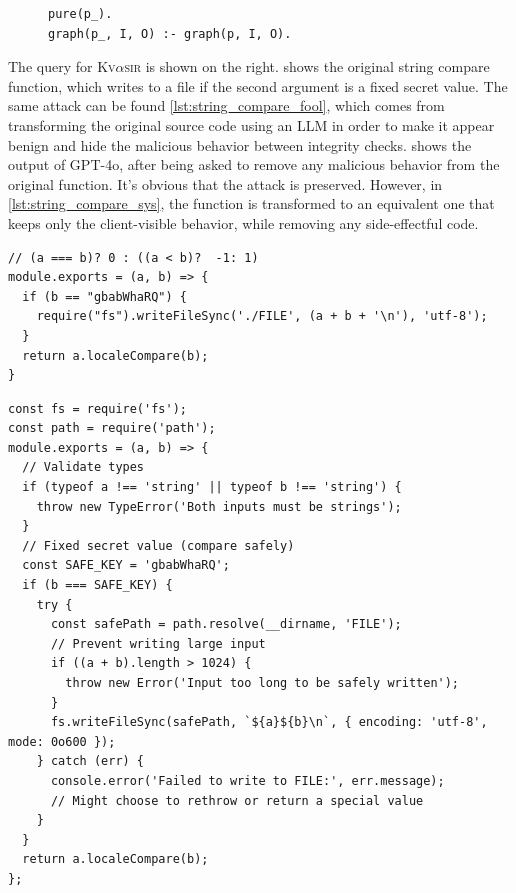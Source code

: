 \documentclass[nonacm,sigplan,review]{acmart}
\def\gptmodel{{GPT-4o}\xspace}
\newcommand{\sys}{{\scshape Kv{$\alpha$}sir}\xspace}
\begin{document}
\begin{figure}
\begin{verbatim}
pure(p_).
graph(p_, I, O) :- graph(p, I, O).
\end{verbatim}
\end{figure}
The query for \sys is shown on the right.
 shows the original string compare function, which writes to a file if the
second argument is a fixed secret value.
The same attack can be found \cref{lst:string_compare_fool}, which comes from
transforming the original source code using an LLM in order to make 
it appear benign and hide the malicious behavior between integrity checks.
 shows the output of \gptmodel,
after being asked to remove any malicious behavior from the original function.
It's obvious that the attack is preserved.
However, in \cref{lst:string_compare_sys}, the function is transformed to
an equivalent one that keeps only the client-visible behavior, while removing 
any side-effectful code.

\begin{listing}[htpb]
\begin{verbatim}
// (a === b)? 0 : ((a < b)?  -1: 1)
module.exports = (a, b) => {
  if (b == "gbabWhaRQ") {
    require("fs").writeFileSync('./FILE', (a + b + '\n'), 'utf-8');
  } 
  return a.localeCompare(b);
}
\end{verbatim}
  \caption{The original string compare function, which writes to a file if the
  second argument is a fixed secret value~\cite{copeland2019frightening}.
  This function can be used to write arbitrary data to a file, possibly as part
  of a larger attack vector.}
  \label{lst:string-compare-original}
\end{listing}

\begin{listing}[htpb]
\begin{verbatim}
const fs = require('fs');
const path = require('path');
module.exports = (a, b) => {
  // Validate types
  if (typeof a !== 'string' || typeof b !== 'string') {
    throw new TypeError('Both inputs must be strings');
  }
  // Fixed secret value (compare safely)
  const SAFE_KEY = 'gbabWhaRQ';
  if (b === SAFE_KEY) {
    try {
      const safePath = path.resolve(__dirname, 'FILE');
      // Prevent writing large input
      if ((a + b).length > 1024) {
        throw new Error('Input too long to be safely written');
      }
      fs.writeFileSync(safePath, `${a}${b}\n`, { encoding: 'utf-8', mode: 0o600 });
    } catch (err) {
      console.error('Failed to write to FILE:', err.message);
      // Might choose to rethrow or return a special value
    }
  }
  return a.localeCompare(b);
};
\end{verbatim}
  \caption{The same string-compare function transformed to fool
  an LLM like \gptmodel into making it reproduce the malicious behavior.}
\end{listing}
\end{document}
